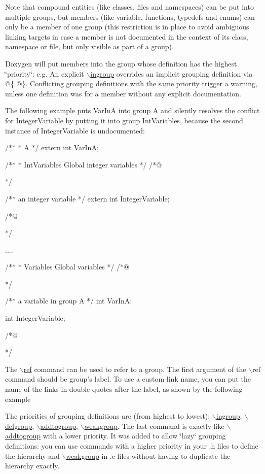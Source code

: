 Note that compound entities (like classes, files and namespaces) can be put into multiple groups, but members (like variable, functions, typedefs and enums) can only be a member of one group (this restriction is in place to avoid ambiguous linking targets in case a member is not documented in the context of its class, namespace or file, but only visible as part of a group).

Doxygen will put members into the group whose definition has the highest \char`\"{}priority\char`\"{}: e.g. An explicit \hyperlink{commands_cmdingroup}{$\backslash$ingroup} overrides an implicit grouping definition via {\ttfamily @\{} {\ttfamily @\}}. Conflicting grouping definitions with the same priority trigger a warning, unless one definition was for a member without any explicit documentation.

The following example puts VarInA into group A and silently resolves the conflict for IntegerVariable by putting it into group IntVariables, because the second instance of IntegerVariable is undocumented:

\begin{DoxyVerb}

/**
 * \ingroup A
 */
extern int VarInA;

/**
 *  IntVariables Global integer variables
 */
/*@{*/

/** an integer variable */
extern int IntegerVariable;

/*@}*/

....

/**
 *  Variables Global variables
 */
/*@{*/

/** a variable in group A */
int VarInA;

int IntegerVariable;

/*@}*/
\end{DoxyVerb}


The \hyperlink{commands_cmdref}{$\backslash$ref} command can be used to refer to a group. The first argument of the $\backslash$ref command should be group's label. To use a custom link name, you can put the name of the links in double quotes after the label, as shown by the following example 


The priorities of grouping definitions are (from highest to lowest): \hyperlink{commands_cmdingroup}{$\backslash$ingroup}, \hyperlink{commands_cmddefgroup}{$\backslash$defgroup}, \hyperlink{commands_cmdaddtogroup}{$\backslash$addtogroup}, \hyperlink{commands_cmdweakgroup}{$\backslash$weakgroup}. The last command is exactly like \hyperlink{commands_cmdaddtogroup}{$\backslash$addtogroup} with a lower priority. It was added to allow \char`\"{}lazy\char`\"{} grouping definitions: you can use commands with a higher priority in your .h files to define the hierarchy and \hyperlink{commands_cmdweakgroup}{$\backslash$weakgroup} in .c files without having to duplicate the hierarchy exactly.

